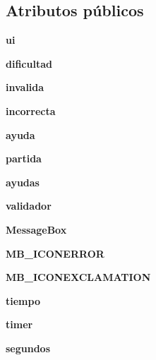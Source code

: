 \subsection*{Atributos públicos}
\begin{DoxyCompactItemize}
\item 
{\bfseries ui}\label{classsudoku_1_1_sudoku_a10cba1664c1eb9e06b1e2be80e491146}

\item 
{\bfseries dificultad}\label{classsudoku_1_1_sudoku_a2967c1d8128e53194947c5663e70318f}

\item 
{\bfseries invalida}\label{classsudoku_1_1_sudoku_aaef20a252919abf513a901c247241a6a}

\item 
{\bfseries incorrecta}\label{classsudoku_1_1_sudoku_a4f4afd0b3785276e719f928474c119dd}

\item 
{\bfseries ayuda}\label{classsudoku_1_1_sudoku_aeb102933d828a4db322986df7ed9c9c5}

\item 
{\bfseries partida}\label{classsudoku_1_1_sudoku_a1280aaf84aa65e77bfcc03d11487e671}

\item 
{\bfseries ayudas}\label{classsudoku_1_1_sudoku_afa5ca87aebb8ea7451b34a357a13d47e}

\item 
{\bfseries validador}\label{classsudoku_1_1_sudoku_a0b10047ea545c0d20858f594ebb33a23}

\item 
{\bfseries Message\-Box}\label{classsudoku_1_1_sudoku_ac82ccedd2ad47903886a0d4d6d0dc72d}

\item 
{\bfseries M\-B\-\_\-\-I\-C\-O\-N\-E\-R\-R\-O\-R}\label{classsudoku_1_1_sudoku_a8b1333d2509e84421b8cd5e13b110895}

\item 
{\bfseries M\-B\-\_\-\-I\-C\-O\-N\-E\-X\-C\-L\-A\-M\-A\-T\-I\-O\-N}\label{classsudoku_1_1_sudoku_a3f05c83e09e7a9ebaa04bf758bc2564d}

\item 
{\bfseries tiempo}\label{classsudoku_1_1_sudoku_af197c9aad28be2bb614b53a7654999a6}

\item 
{\bfseries timer}\label{classsudoku_1_1_sudoku_a0da495ba22f336a9d6593d80be5e8a8a}

\item 
{\bfseries segundos}\label{classsudoku_1_1_sudoku_a681d3ae6b17d362ee8e4e0b0985fe6b6}


\end{DoxyCompactItemize}
